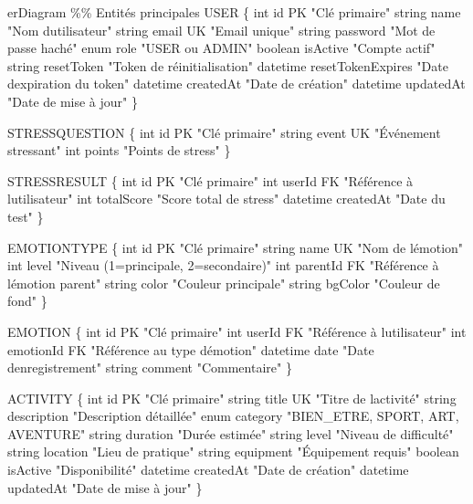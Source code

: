 \documentclass[
]{article}
\newenvironment{Shaded}{}{}
\newcommand{\NormalTok}[1]{#1}
\begin{document}
\begin{Shaded}
\begin{Highlighting}[]
\NormalTok{erDiagram}
\NormalTok{    \%\% Entités principales}
\NormalTok{    USER \{}
\NormalTok{        int id PK "Clé primaire"}
\NormalTok{        string name "Nom d\textquotesingle{}utilisateur"}
\NormalTok{        string email UK "Email unique"}
\NormalTok{        string password "Mot de passe haché"}
\NormalTok{        enum role "USER ou ADMIN"}
\NormalTok{        boolean isActive "Compte actif"}
\NormalTok{        string resetToken "Token de réinitialisation"}
\NormalTok{        datetime resetTokenExpires "Date d\textquotesingle{}expiration du token"}
\NormalTok{        datetime createdAt "Date de création"}
\NormalTok{        datetime updatedAt "Date de mise à jour"}
\NormalTok{    \}}
    
\NormalTok{    STRESSQUESTION \{}
\NormalTok{        int id PK "Clé primaire"}
\NormalTok{        string event UK "Événement stressant"}
\NormalTok{        int points "Points de stress"}
\NormalTok{    \}}
    
\NormalTok{    STRESSRESULT \{}
\NormalTok{        int id PK "Clé primaire"}
\NormalTok{        int userId FK "Référence à l\textquotesingle{}utilisateur"}
\NormalTok{        int totalScore "Score total de stress"}
\NormalTok{        datetime createdAt "Date du test"}
\NormalTok{    \}}
    
\NormalTok{    EMOTIONTYPE \{}
\NormalTok{        int id PK "Clé primaire"}
\NormalTok{        string name UK "Nom de l\textquotesingle{}émotion"}
\NormalTok{        int level "Niveau (1=principale, 2=secondaire)"}
\NormalTok{        int parentId FK "Référence à l\textquotesingle{}émotion parent"}
\NormalTok{        string color "Couleur principale"}
\NormalTok{        string bgColor "Couleur de fond"}
\NormalTok{    \}}
    
\NormalTok{    EMOTION \{}
\NormalTok{        int id PK "Clé primaire"}
\NormalTok{        int userId FK "Référence à l\textquotesingle{}utilisateur"}
\NormalTok{        int emotionId FK "Référence au type d\textquotesingle{}émotion"}
\NormalTok{        datetime date "Date d\textquotesingle{}enregistrement"}
\NormalTok{        string comment "Commentaire"}
\NormalTok{    \}}
    
\NormalTok{    ACTIVITY \{}
\NormalTok{        int id PK "Clé primaire"}
\NormalTok{        string title UK "Titre de l\textquotesingle{}activité"}
\NormalTok{        string description "Description détaillée"}
\NormalTok{        enum category "BIEN\_ETRE, SPORT, ART, AVENTURE"}
\NormalTok{        string duration "Durée estimée"}
\NormalTok{        string level "Niveau de difficulté"}
\NormalTok{        string location "Lieu de pratique"}
\NormalTok{        string equipment "Équipement requis"}
\NormalTok{        boolean isActive "Disponibilité"}
\NormalTok{        datetime createdAt "Date de création"}
\NormalTok{        datetime updatedAt "Date de mise à jour"}
\NormalTok{    \}}
    

\end{Highlighting}
\end{Shaded}
\end{document}
